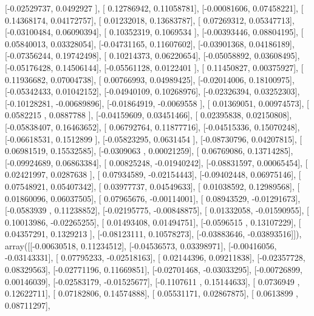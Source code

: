 \documentclass{article}
\begin{document}
       [-0.02529737,  0.0492927 ],
       [ 0.12786942,  0.11058781],
       [-0.00081606,  0.07458221],
       [ 0.14368174,  0.04172757],
       [ 0.01232018,  0.13683787],
       [ 0.07269312,  0.05347713],
       [-0.03100484,  0.06090394],
       [ 0.10352319,  0.1069534 ],
       [-0.00393446,  0.08804195],
       [ 0.05840013,  0.03328054],
       [-0.04731165,  0.11607602],
       [-0.03901368,  0.04186189],
       [-0.07356244,  0.19742498],
       [ 0.10214373,  0.06220654],
       [-0.05058892,  0.03608495],
       [-0.05176428,  0.14506144],
       [-0.05561128,  0.0122401 ],
       [ 0.11450827,  0.00375927],
       [ 0.11936682,  0.07004738],
       [ 0.00766993,  0.04989425],
       [-0.02014006,  0.18100975],
       [-0.05342433,  0.01042152],
       [-0.04940109,  0.10268976],
       [-0.02326394,  0.03252303],
       [-0.10128281, -0.00689896],
       [-0.01864919, -0.0069558 ],
       [ 0.01369051,  0.00974573],
       [ 0.0582215 ,  0.0887788 ],
       [-0.04159609,  0.03451466],
       [ 0.02395838,  0.02150808],
       [-0.05838407,  0.16463652],
       [ 0.06792764,  0.11877716],
       [-0.04515336,  0.15070248],
       [-0.06618531,  0.1512899 ],
       [-0.05823295,  0.0631454 ],
       [-0.08730796,  0.04207815],
       [ 0.06981519,  0.15532585],
       [-0.0309063 ,  0.00021259],
       [ 0.06769086,  0.13714285],
       [-0.09924689,  0.06863384],
       [ 0.00825248, -0.01940242],
       [-0.08831597,  0.00065454],
       [ 0.02421997,  0.0287638 ],
       [ 0.07934589, -0.02154443],
       [-0.09402448,  0.06975146],
       [ 0.07548921,  0.05407342],
       [ 0.03977737,  0.04549633],
       [ 0.01038592,  0.12989568],
       [ 0.01860096,  0.06037505],
       [ 0.07965676, -0.00114001],
       [ 0.08943529, -0.01291673],
       [-0.0583939 ,  0.11238852],
       [-0.02195775, -0.00848875],
       [ 0.01332058, -0.01590955],
       [ 0.10013986, -0.02265255],
       [ 0.01493408,  0.01494751],
       [-0.0596515 ,  0.13107229],
       [ 0.04357291,  0.1329213 ],
       [-0.08123111,  0.10578273],
       [-0.03883646, -0.03893516]]), array([[-0.00630518,  0.11234512],
       [-0.04536573,  0.03398971],
       [-0.00416056, -0.03143331],
       [ 0.07795233, -0.02518163],
       [ 0.02144396,  0.09211838],
       [-0.02357728,  0.08329563],
       [-0.02771196,  0.11669851],
       [-0.02701468, -0.03033295],
       [-0.00726899,  0.00146039],
       [-0.02583179, -0.01525677],
       [-0.1107611 ,  0.15144633],
       [ 0.0736949 ,  0.12622711],
       [ 0.07182806,  0.14574888],
       [ 0.05531171,  0.02867875],
       [ 0.0613899 ,  0.08711297],
\end{document}
